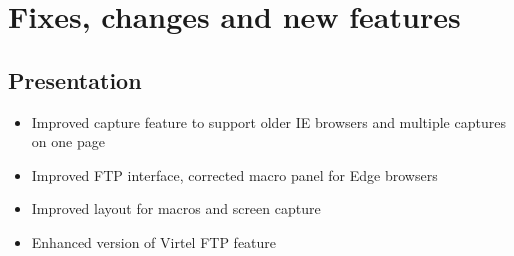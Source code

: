 \documentclass[letterpaper,10pt,english]{sphinxmanual}
\begin{document}
\chapter{Fixes, changes and new features}
\label{\detokenize{TN202003:fixes-changes-and-new-features}}

\section{Presentation}
\label{\detokenize{TN202003:presentation}}
\begin{itemize}
\item {} 
Improved capture feature to support older IE browsers and multiple captures on one page

\end{itemize}

\begin{itemize}
\item {} 
Improved FTP interface, corrected macro panel for Edge browsers

\end{itemize}

\begin{itemize}
\item {} 
Improved layout for macros and screen capture

\end{itemize}

\begin{itemize}
\item {} 
Enhanced version of Virtel FTP feature

\end{itemize}
\end{document}
